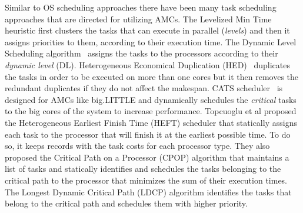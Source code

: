 Similar to OS scheduling approaches there have been many task scheduling approaches that are directed for utilizing AMCs.
The Levelized Min Time~\cite{Hetero95} heuristic first clusters the tasks that can execute in parallel (\textit{levels}) and then it assigns priorities to them, according to their execution time.
The Dynamic Level Scheduling algorithm~\cite{Hetero93} assigns the tasks to the processors according to their \textit{dynamic level} (DL).
Heterogeneous Economical Duplication (HED)~\cite{Dup09} duplicates the tasks in order to be executed on more than one cores but it then
removes the redundant duplicates if they do not affect the makespan. 
CATS scheduler~\cite{Chronaki:ICS2015} is designed for AMCs like big.LITTLE and dynamically schedules the \textit{critical} tasks to the big cores of the system to increase performance. 
Topcuoglu et al proposed the Heterogeneous Earliest Finish Time (HEFT) scheduler that statically assigns each task to the processor that will finish it at the earliest possible time. To do so, it keeps records with the task costs for each processor type.
They also proposed the Critical Path on a Processor (CPOP) algorithm \cite{HEFT} that maintains a list of tasks and statically identifies and schedules the tasks belonging to the critical path  to the processor that minimizes the sum of their execution times. 
The Longest Dynamic Critical Path (LDCP) algorithm \cite{LDCP} identifies the tasks that belong to the critical path and schedules them with higher priority.

